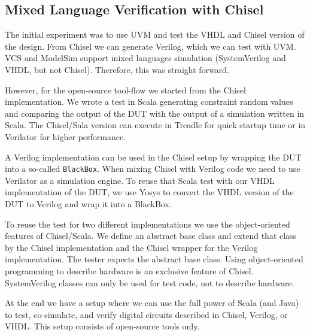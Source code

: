 \documentclass[conference]{IEEEtran}
\newcommand{\code}[1]{{\small{\texttt{#1}}}}
\newcommand{\martin}[1]{{\color{blue} Martin: #1}}
\newcommand{\ducky}[1]{{\color{orange} Richard: #1}}
\begin{document}
\subsection{Mixed Language Verification with Chisel}

The initial experiment was to use UVM and test the VHDL and Chisel version of the
design. From Chisel we can generate Verilog, which we can test with UVM.
VCS and ModelSim support mixed languages simulation (SystemVerilog and VHDL,
but not Chisel). Therefore, this was straight forward.

However, for the open-source tool-flow we started from the Chisel implementation.
We wrote a test in Scala generating constraint random values and comparing the output
of the DUT with the output of a simulation written in Scala.
The Chisel/Sala version can execute in Treadle for  quick startup time or in Verilator
for higher performance.

A Verilog implementation can be used in the Chisel setup by wrapping the DUT
into a so-called \code{BlackBox}. When mixing Chisel with Verilog code we need
to use Verilator as a simulation engine.
To reuse that Scala test with our VHDL implementation of the DUT, we use Yosys
to convert the VHDL version of the DUT to Verilog and wrap it into a BlackBox.

To reuse the test for two different implementations we use the object-oriented features
of Chisel/Scala. We define an abstract base class and extend that class by the Chisel
implementation and the Chisel wrapper for the Verilog implementation.
The tester expects the abstract base class.
Using object-oriented programming to describe hardware is an exclusive
feature of Chisel. SystemVerilog classes can only be used for test code,
not to describe hardware.

At the end we have a setup where we can use the full power of Scala (and Java)
to test, co-simulate, and verify digital circuits described in Chisel, Verilog, or VHDL.
This setup consists of open-source tools only.


\end{document}
